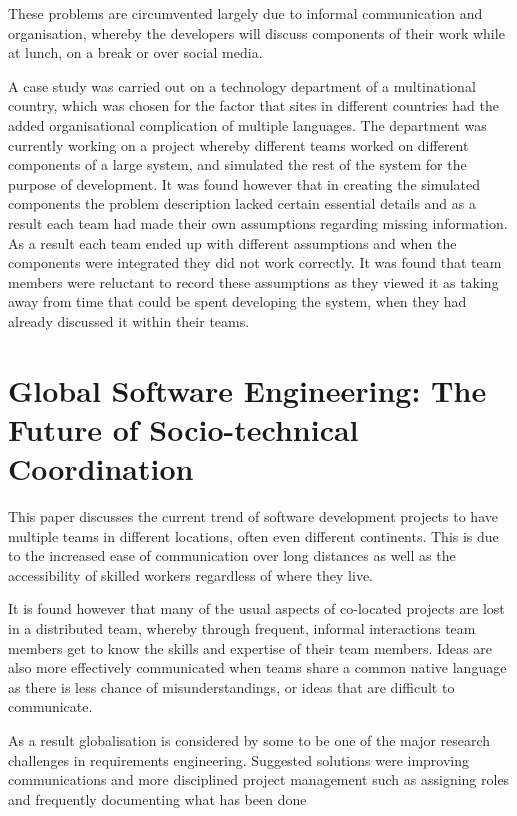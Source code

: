 \documentclass{l4proj}
\begin{document}
These problems are circumvented largely due to informal communication and organisation, whereby the developers will discuss components of their work while at lunch, on a break or over social media.

A case study was carried out on a technology department of a multinational country, which was chosen for the factor that sites in different countries had the added organisational complication of multiple languages.  The department was currently working on a project whereby different teams worked on different components of a large system, and simulated the rest of the system for the purpose of development.  It was found however that in creating the simulated components the problem description lacked certain essential details and as a result each team had made their own assumptions regarding missing information.  As a result each team ended up with different assumptions and when the components were integrated they did not work correctly.  It was found that team members were reluctant to record these assumptions as they viewed it as taking away from time that could be spent developing the system, when they had already discussed it within their teams.

\section{Global Software Engineering: The Future of Socio-technical Coordination}

This paper discusses the current trend of software development projects to have multiple teams in different locations, often even different continents.  This is due to the increased ease of communication over long distances as well as the accessibility of skilled workers regardless of where they live.

It is found however that many of the usual aspects of co-located projects are lost in a distributed team, whereby through frequent, informal interactions team members get to know the skills and expertise of their team members.  Ideas are also more effectively communicated when teams share a common native language as there is less chance of misunderstandings, or ideas that are difficult to communicate.

As a result globalisation is considered by some to be one of the major research challenges in requirements engineering.  Suggested solutions were improving communications and more disciplined project management such as assigning roles and frequently documenting what has been done
\end{document}
